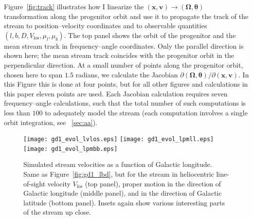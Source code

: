 \documentclass{emulateapj}
\renewcommand{\figurename}{Figure}
\renewcommand{\vec}[1]{\ensuremath{\mathbf{#1}}}
\newcommand{\vecx}{\ensuremath{\vec{x}}}
\newcommand{\vecv}{\ensuremath{\vec{v}}}
\newcommand{\veco}{\ensuremath{\vec{\Omega}}}
\newcommand{\veca}{\ensuremath{\boldsymbol\theta}}
\newcommand{\vlos}{\ensuremath{V_{\mathrm{los}}}}
\newcommand{\pmll}{\ensuremath{\mu_l}}
\newcommand{\pmbb}{\ensuremath{\mu_b}}
\begin{document}
\figurename~\ref{fig:track} illustrates how I linearize the
$(\vecx,\vecv) \rightarrow (\veco,\veca)$ transformation along the
progenitor orbit and use it to propagate the track of the stream to
position--velocity coordinates and to observable quantities
$(l,b,D,\vlos,\pmll,\pmbb)$. The top panel shows the orbit of the
progenitor and the mean stream track in frequency--angle
coordinates. Only the parallel direction is shown here; the mean
stream track coincides with the progenitor orbit in the perpendicular
direction. At a small number of points along the progenitor orbit,
chosen here to span $1.5$ radians, we calculate the Jacobian $\partial
(\veco,\veca) / \partial (\vecx,\vecv)$. In this Figure this is done
at four points, but for all other figures and calculations in this
paper eleven points are used. Each Jacobian calculation requires seven
frequency--angle calculations, such that the total number of such
computations is less than $100$ to adequately model the stream (each
computation involves a single orbit integration, see
\appendixname~\ref{sec:aa}). 

\begin{figure}[tp!!]
\begin{center}
  \texttt{[image: gd1\_evol\_lvlos.eps]}
  \texttt{[image: gd1\_evol\_lpmll.eps]}
  \texttt{[image: gd1\_evol\_lpmbb.eps]}
  \caption{Simulated stream velocities as a function of Galactic
    longitude. Same as \figurename~\ref{fig:gd1_lbd}, but for the
    stream in heliocentric line-of-sight velocity $V_{\mathrm{los}}$
    (top panel), proper motion in the direction of Galactic longitude
    (middle panel), and in the direction of Galactic latitude (bottom
    panel). Insets again show various interesting parts of the stream
    up close.}\label{fig:gd1_lbv}
\end{center}
\end{figure}
\end{document}
